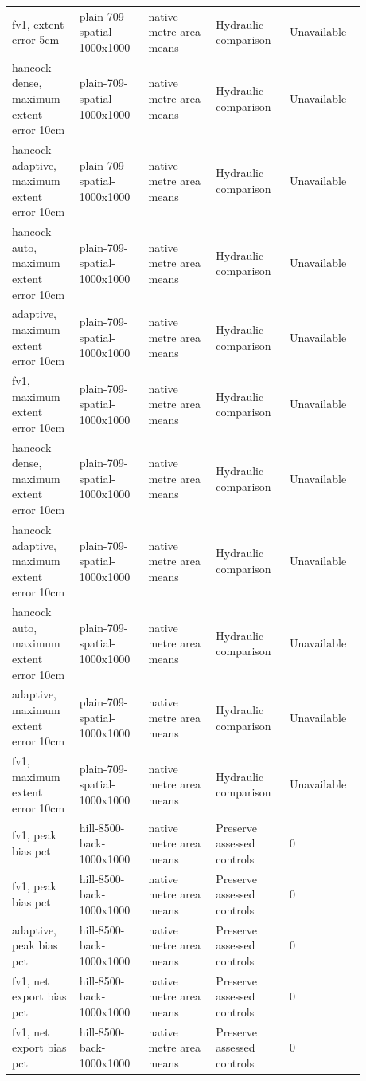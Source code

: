 \begin{longtable}{p{0.1760\linewidth}p{0.1760\linewidth}p{0.1760\linewidth}p{0.1760\linewidth}p{0.1760\linewidth}}
fv1, extent error 5cm & plain-709-spatial-1000x1000 & native metre area means & Hydraulic comparison & Unavailable \\
hancock dense, maximum extent error 10cm & plain-709-spatial-1000x1000 & native metre area means & Hydraulic comparison & Unavailable \\
hancock adaptive, maximum extent error 10cm & plain-709-spatial-1000x1000 & native metre area means & Hydraulic comparison & Unavailable \\
hancock auto, maximum extent error 10cm & plain-709-spatial-1000x1000 & native metre area means & Hydraulic comparison & Unavailable \\
adaptive, maximum extent error 10cm & plain-709-spatial-1000x1000 & native metre area means & Hydraulic comparison & Unavailable \\
fv1, maximum extent error 10cm & plain-709-spatial-1000x1000 & native metre area means & Hydraulic comparison & Unavailable \\
hancock dense, maximum extent error 10cm & plain-709-spatial-1000x1000 & native metre area means & Hydraulic comparison & Unavailable \\
hancock adaptive, maximum extent error 10cm & plain-709-spatial-1000x1000 & native metre area means & Hydraulic comparison & Unavailable \\
hancock auto, maximum extent error 10cm & plain-709-spatial-1000x1000 & native metre area means & Hydraulic comparison & Unavailable \\
adaptive, maximum extent error 10cm & plain-709-spatial-1000x1000 & native metre area means & Hydraulic comparison & Unavailable \\
fv1, maximum extent error 10cm & plain-709-spatial-1000x1000 & native metre area means & Hydraulic comparison & Unavailable \\
fv1, peak bias pct & hill-8500-back-1000x1000 & native metre area means & Preserve assessed controls & 0 \\
fv1, peak bias pct & hill-8500-back-1000x1000 & native metre area means & Preserve assessed controls & 0 \\
adaptive, peak bias pct & hill-8500-back-1000x1000 & native metre area means & Preserve assessed controls & 0 \\
fv1, net export bias pct & hill-8500-back-1000x1000 & native metre area means & Preserve assessed controls & 0 \\
fv1, net export bias pct & hill-8500-back-1000x1000 & native metre area means & Preserve assessed controls & 0 \\

\end{longtable}
